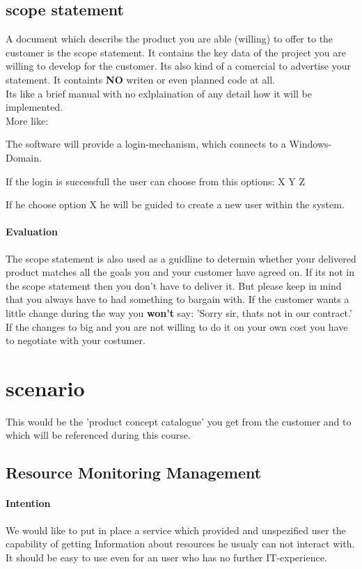 \documentclass[11pt]{article}
\begin{document}
\subsection{scope statement}
A document which describs the product you are able (willing) to offer to the customer is the scope statement.
It contains the key data of the project you are willing to develop for the customer.
Its also kind of a comercial to advertise your statement. It containts \textbf{NO} writen or even planned code at all. \\
Its like a brief manual with no exlplaination of any detail how it will be implemented. \\
More like: \\
{\colorbox{lGray}{The software will provide a login-mechanism, which connects to a Windows-Domain.} \\
{\colorbox{lGray}{If the login is successfull the user can choose from this options: X Y Z}\\
{\colorbox{lGray}{If he choose option X he will be guided to create a new user within the system.}

\paragraph{Evaluation} The scope statement is also used as a guidline to determin whether your delivered product matches all the goals you and your customer have agreed on.
If its not in the scope statement then you don't have to deliver it. But please keep in mind that you always have to had something to bargain with.
If the customer wants a little change during the way you \textbf{won't} say: 'Sorry sir, thats not in our contract.' \\
If the changes to big and you are not willing to do it on your own cost you have to negotiate with your costumer.

\section{scenario}
This would be the 'product concept catalogue' you get from the customer and to which will be referenced during this course.
\subsection{Resource Monitoring Management}
\paragraph{Intention}
We would like to put in place a service which provided and unspezified user
the capability of getting Information about resources he usualy can not interact with.
It should be easy to use even for an user who has no further IT-experience.
}}}
\end{document}
